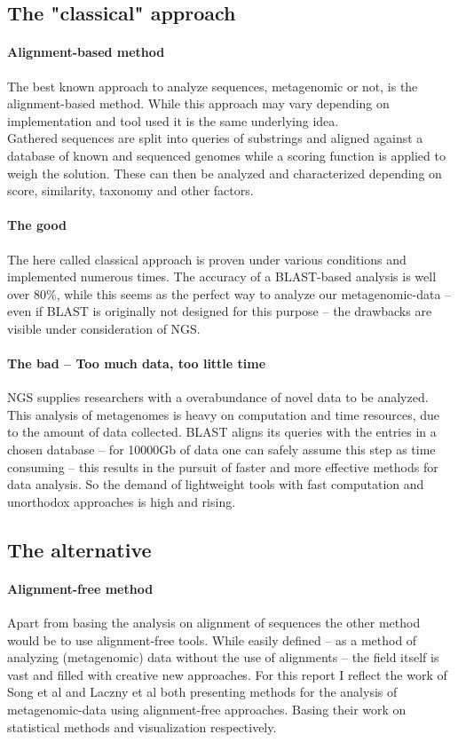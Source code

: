 \documentclass[twocolumn]{bmcart}%
\begin{document}
\subsection*{The "classical" approach}
\paragraph*{Alignment-based method}
The best known approach to analyze sequences, metagenomic or not, is the alignment-based method. While this approach may vary depending on implementation and tool used it is the same underlying idea.\\
Gathered sequences are split into queries of substrings and aligned against a database of known and sequenced genomes while a scoring function is applied to weigh the  solution. These can then be analyzed and characterized depending on score, similarity, taxonomy and other factors.
\paragraph*{The good}
The here called classical approach is proven under various conditions and implemented numerous times. The accuracy of a BLAST-based analysis is well over 80\%\cite{doi:10.1142/9789814295291_0003}, while this seems as the perfect way to analyze our metagenomic-data -- even if BLAST is originally not designed for this purpose -- the drawbacks are visible under consideration of NGS.
\paragraph*{The bad -- Too much data, too little time}
NGS supplies researchers with a overabundance of novel data to be analyzed. This analysis of metagenomes is heavy on computation and time resources, due to the amount of data collected. BLAST aligns its queries with the entries in a chosen database -- for 10000Gb of data one can safely assume this step as time consuming -- this results in the pursuit of faster and more effective methods for data analysis. So the demand of lightweight tools with fast computation and unorthodox approaches is high and rising.
\subsection*{The alternative}
\paragraph*{Alignment-free method}
Apart from basing the analysis on alignment of sequences the other method would be to use alignment-free tools. While easily defined -- as a method of analyzing (metagenomic) data without the use of alignments -- the field itself is vast and filled with creative new approaches. For this report I reflect the work of Song et al \cite{doi:10.1093/bib/bbt067} and Laczny et al \cite{Laczny2014} both presenting methods for the analysis of metagenomic-data using alignment-free approaches. Basing their work on statistical methods and visualization respectively.
\end{document}
